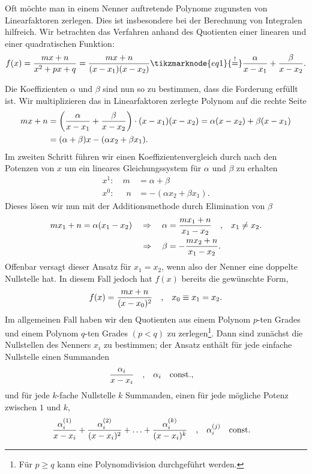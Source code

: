 Oft möchte man in einem Nenner auftretende Polynome zugunsten von Linearfaktoren zerlegen. Dies ist insbesondere bei der Berechnung von Integralen hilfreich. Wir betrachten das Verfahren anhand des Quotienten einer linearen und einer quadratischen Funktion: 
\begin{align}
    f(x) = \frac{mx + n}{x^2 +px + q} = \frac{mx +n}{(x-x_1)(x-x_2)} \tikzmarknode{eq1}{\overset{!}{=}} \frac{\alpha}{x-x_1} + \frac{\beta}{x-x_2}.
\end{align}

Die Koeffizienten $\alpha$ und $\beta$ sind nun so zu bestimmen, dass die Forderung erfüllt ist. Wir multiplizieren das in Linearfaktoren zerlegte Polynom auf die rechte Seite 
\begin{align}
    mx + n &= \qty(\frac{\alpha}{x-x_1} + \frac{\beta}{x-x_2}) \cdot (x-x_1)(x-x_2) = \alpha (x-x_2) + \beta(x-x_1) \notag \\
    &= (\alpha + \beta) x - (\alpha x_2 + \beta x_1).
\end{align}
Im zweiten Schritt führen wir einen Koeffizientenvergleich durch nach den Potenzen von $x$ um ein lineares Gleichungssystem für $\alpha$ und $\beta$ zu erhalten
\begin{subequations}
    \begin{align}
        x^1: \quad m &= \alpha + \beta \\
        x^0: \quad \;\,n &= -(\alpha x_2 + \beta x_1).
    \end{align}
\end{subequations}
Dieses lösen wir nun mit der Additionsmethode durch Elimination von $\beta$ 
\begin{align}
    m x_1 + n = \alpha (x_1 - x_2) \quad \Rightarrow \quad \alpha &= \frac{m x_1 + n}{x_1 -x_2} \qq{,} x_1 \neq x_2. \\
    \Rightarrow \quad \beta &= -\frac{m x_2 + n}{x_1 -x_2}.
\end{align}
Offenbar versagt dieser Ansatz für $x_1 = x_2$, wenn also der Nenner eine doppelte Nullstelle hat. In diesem Fall jedoch hat $f(x)$ bereits die gewünschte Form, 
\begin{align}
    f(x) = \frac{mx + n}{(x-x_0)^2} \qq{,} x_0 \equiv x_1 = x_2.
\end{align}
Im allgemeinen Fall haben wir den Quotienten aus einem Polynom $p$-ten Grades und einem Polynom $q$-ten Grades $(p < q)$ zu zerlegen\footnote{Für $p\ge q$ kann eine Polynomdivision durchgeführt werden.}. Dann sind zunächst die Nullstellen des Nenners $x_i$ zu bestimmen; der Ansatz enthält für jede einfache Nullstelle einen Summanden 
\begin{align}
    \frac{\alpha_i}{x-x_i} \qq{,} \alpha_i \qq{const.,}
\end{align}
und für jede $k$-fache Nullstelle $k$ Summanden, einen für jede mögliche Potenz zwischen $1$ und $k$, 
\begin{align}
    \frac{\alpha_i^{(1)}}{x-x_i} + \frac{\alpha_i^{(2)}}{(x-x_i)^2} + \hdots + \frac{\alpha_i^{(k)}}{(x-x_i)^k} \qq{,} \alpha_i^{(j)} \qq{const.}
\end{align} 


